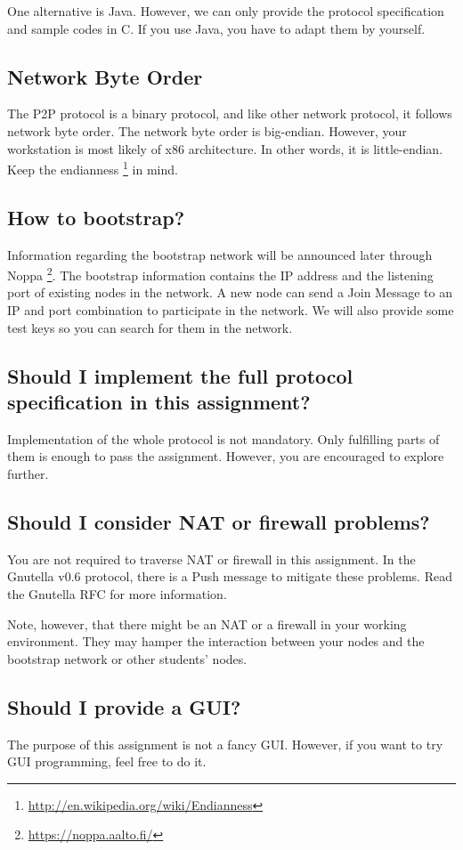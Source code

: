 \documentclass[12pt, a4paper]{article}
\begin{document}
One alternative is Java.
However, we can only provide the protocol specification and sample codes in C.
If you use Java, you have to adapt them by yourself.

\subsection*{Network Byte Order}
The P2P protocol is a binary protocol, and like other network protocol, it follows network byte order.
The network byte order is big-endian.
However, your workstation is most likely of x86 architecture.
In other words, it is little-endian.
Keep the endianness \footnote{\url{http://en.wikipedia.org/wiki/Endianness}} in mind.

\subsection*{How to bootstrap?}
Information regarding the bootstrap network will be announced later through Noppa \footnote{\url{https://noppa.aalto.fi/}}.
The bootstrap information contains the IP address and the listening port of existing nodes in the network.
A new node can send a Join Message to an IP and port combination to participate in the network.
We will also provide some test keys so you can search for them in the network.

\subsection*{Should I implement the full protocol specification in this assignment?}
Implementation of the whole protocol is not mandatory.
Only fulfilling parts of them is enough to pass the assignment.
However, you are encouraged to explore further.

\subsection*{Should I consider NAT or firewall problems?}
You are not required to traverse NAT or firewall in this assignment.
In the Gnutella v0.6 protocol, there is a Push message to mitigate these problems.
Read the Gnutella RFC for more information.

Note, however, that there might be an NAT or a firewall in your working environment.
They may hamper the interaction between your nodes and the bootstrap network or other students' nodes.

\subsection*{Should I provide a GUI?}
The purpose of this assignment is not a fancy GUI.
However, if you want to try GUI programming, feel free to do it.
\end{document}
